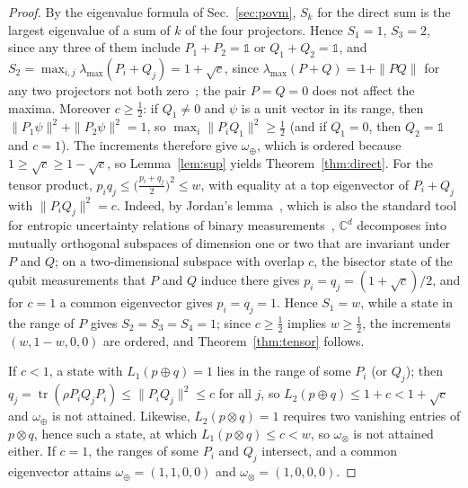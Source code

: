 \documentclass[aps,pra,twocolumn,superscriptaddress,nofootinbib,floatfix]{revtex4-2}
\theoremstyle{definition}
\newcommand{\tr}{\operatorname{tr}}
\newcommand{\omplus}{\omega_{\oplus}}
\newcommand{\omtimes}{\omega_{\otimes}}
\newcommand{\sqc}{\sqrt{c}}
\begin{document}
\begin{proof}
By the eigenvalue formula of Sec.~\ref{sec:povm}, $S_k$ for the direct sum is
the largest eigenvalue of a sum of $k$ of the four projectors. Hence $S_1=1$,
$S_3=2$, since any three of them include $P_1+P_2=\mathds{1}$ or
$Q_1+Q_2=\mathds{1}$, and $S_2=\max_{i,j}\lambda_{\max}(P_i+Q_j)=1+\sqc$, since
$\lambda_{\max}(P+Q)=1+\|PQ\|$ for any two projectors not both
zero~\cite{Halmos1969}; the pair $P=Q=0$ does not affect the maxima.
Moreover $c\ge\frac12$: if $Q_1\neq0$ and $\psi$ is a unit vector in its range,
then $\|P_1\psi\|^2+\|P_2\psi\|^2=1$, so $\max_i\|P_iQ_1\|^2\ge\frac12$ (and if
$Q_1=0$, then $Q_2=\mathds{1}$ and $c=1$). The increments therefore give
$\omplus$, which is ordered because $1\ge\sqc\ge1-\sqc$, so
Lemma~\ref{lem:sup} yields Theorem~\ref{thm:direct}. For the tensor product,
$p_iq_j\le\bigl(\frac{p_i+q_j}{2}\bigr)^2\le w$, with equality at a top
eigenvector of $P_i+Q_j$ with $\|P_iQ_j\|^2=c$. Indeed, by Jordan's
lemma~\cite{Halmos1969}, which is also the standard tool for entropic
uncertainty relations of binary measurements~\cite{KTW2014}, $\mathbb{C}^d$
decomposes into mutually orthogonal subspaces of dimension one or two that are
invariant under $P$ and $Q$; on a two-dimensional subspace with overlap $c$, the
bisector state of the qubit measurements that $P$ and $Q$ induce there gives
$p_i=q_j=(1+\sqc)/2$, and for $c=1$ a common eigenvector gives $p_i=q_j=1$.
Hence $S_1=w$, while a state in the range of $P$ gives $S_2=S_3=S_4=1$; since
$c\ge\frac12$ implies $w\ge\frac12$, the increments $(w,1-w,0,0)$ are ordered,
and Theorem~\ref{thm:tensor} follows.

If $c<1$, a state with $L_1(p\oplus q)=1$ lies in the range of some $P_i$ (or
$Q_j$); then $q_j=\tr(\rho P_iQ_jP_i)\le\|P_iQ_j\|^2\le c$ for all $j$, so
$L_2(p\oplus q)\le1+c<1+\sqc$ and $\omplus$ is not attained. Likewise,
$L_2(p\otimes q)=1$ requires two vanishing entries of $p\otimes q$, hence such
a state, at which $L_1(p\otimes q)\le c<w$, so $\omtimes$ is not attained
either. If $c=1$, the ranges of some $P_i$ and $Q_j$ intersect, and a common
eigenvector attains $\omplus=(1,1,0,0)$ and $\omtimes=(1,0,0,0)$.
\end{proof}
\end{document}

